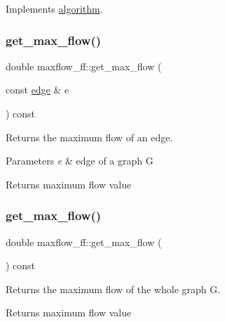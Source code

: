 Implements \mbox{\hyperlink{classalgorithm_a76361fb03ad1cf643affc51821e43bed}{algorithm}}.

\mbox{\label{classmaxflow__ff_a4c120a7ea9be23d908036ebd2fb9298c}} 
\subsubsection{\texorpdfstring{get\+\_\+max\+\_\+flow()}{get\_max\_flow()}\hspace{0.1cm}{\footnotesize\ttfamily [1/2]}}
{\footnotesize\ttfamily double maxflow\+\_\+ff\+::get\+\_\+max\+\_\+flow (\begin{DoxyParamCaption}\item[{const \mbox{\hyperlink{classedge}{edge}} \&}]{e }\end{DoxyParamCaption}) const}

Returns the maximum flow of an edge.


\begin{DoxyParams}{Parameters}
{\em e} & edge of a graph G \\
\hline
\end{DoxyParams}
\begin{DoxyReturn}{Returns}
maximum flow value 
\end{DoxyReturn}
\mbox{\label{classmaxflow__ff_a04d1ea509c13e500b62cad061ee8a2b9}} 
\subsubsection{\texorpdfstring{get\+\_\+max\+\_\+flow()}{get\_max\_flow()}\hspace{0.1cm}{\footnotesize\ttfamily [2/2]}}
{\footnotesize\ttfamily double maxflow\+\_\+ff\+::get\+\_\+max\+\_\+flow (\begin{DoxyParamCaption}{ }\end{DoxyParamCaption}) const}

Returns the maximum flow of the whole graph G.

\begin{DoxyReturn}{Returns}
maximum flow value 
\end{DoxyReturn}
\mbox{\label{classmaxflow__ff_a3b66acf996ff5be94de8b2cfdb3164c3}} 
